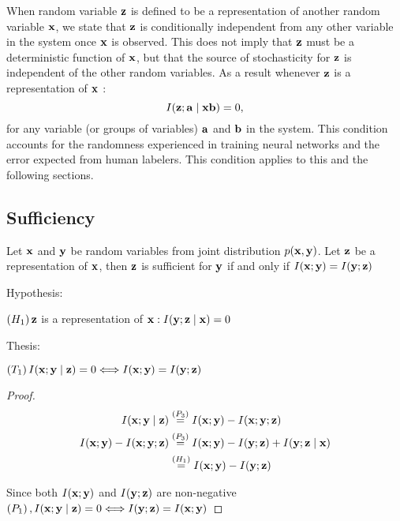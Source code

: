 When random variable ${\mathbf{z}}$ is defined to be a representation of another random variable ${\mathbf{x}}$, we state that ${\mathbf{z}}$ is conditionally independent from any other variable in the system once ${\mathbf{x}}$ is observed. This does not imply that ${\mathbf{z}}$ must be a deterministic function of ${\mathbf{x}}$, but that the source of stochasticity for ${\mathbf{z}}$ is independent of the other random variables. As a result whenever ${\mathbf{z}}$ is a representation of ${\mathbf{x}}$ :
$$
I({\mathbf{z}} ; {\mathbf{a}} \mid {\mathbf{x}} {\mathbf{b}})=0,
$$
for any variable (or groups of variables) ${\mathbf{a}}$ and ${\mathbf{b}}$ in the system. This condition accounts for the randomness experienced in training neural networks and the error expected from human labelers. This condition applies to this and the following sections.

\subsection{Sufficiency}

\begin{proposition}

Let ${\mathbf{x}}$ and ${\mathbf{y}}$ be random variables from joint distribution $p({\mathbf{x}}, {\mathbf{y}})$. Let ${\mathbf{z}}$ be a representation of ${\mathbf{x}}$, then ${\mathbf{z}}$ is sufficient for ${\mathbf{y}}$ if and only if $I({\mathbf{x}} ; {\mathbf{y}})=I({\mathbf{y}} ; {\mathbf{z}})$

Hypothesis:

$\left(H_1\right) {\mathbf{z}}$ is a representation of ${\mathbf{x}}: I({\mathbf{y}} ; {\mathbf{z}} \mid {\mathbf{x}})=0$

Thesis:

$\left(T_1\right) I({\mathbf{x}} ; {\mathbf{y}} \mid {\mathbf{z}})=0 \Longleftrightarrow I({\mathbf{x}} ; {\mathbf{y}})=I({\mathbf{y}} ; {\mathbf{z}})$

\begin{proof}
$$
\begin{aligned}
I({\mathbf{x}} ; {\mathbf{y}} \mid {\mathbf{z}}) & \stackrel{\left(P_3\right)}{=} I({\mathbf{x}} ; {\mathbf{y}})-I({\mathbf{x}} ; {\mathbf{y}} ; {\mathbf{z}}) \\
I({\mathbf{x}} ; {\mathbf{y}})-I({\mathbf{x}} ; {\mathbf{y}} ; {\mathbf{z}}) &
\stackrel{\left(P_3\right)}{=} I({\mathbf{x}} ; {\mathbf{y}})-I({\mathbf{y}} ; {\mathbf{z}})+I({\mathbf{y}} ; {\mathbf{z}} \mid {\mathbf{x}}) \\
& \stackrel{\left(H_1\right)}{=} I({\mathbf{x}} ; {\mathbf{y}})-I({\mathbf{y}} ; {\mathbf{z}})
\end{aligned}
$$

Since both $I({\mathbf{x}} ; {\mathbf{y}})$ and $I({\mathbf{y}} ; {\mathbf{z}})$ are non-negative $\left(P_1\right), I({\mathbf{x}} ; {\mathbf{y}} \mid {\mathbf{z}})=0 \Longleftrightarrow I({\mathbf{y}} ; {\mathbf{z}})=I({\mathbf{x}} ; {\mathbf{y}})$

\end{proof}
\label{app:domain_sufficiency}
\end{proposition}

